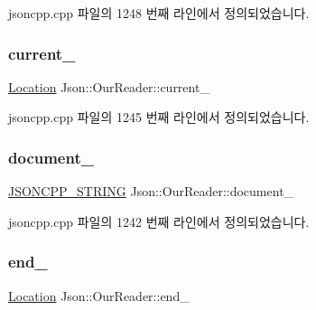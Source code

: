 jsoncpp.\+cpp 파일의 1248 번째 라인에서 정의되었습니다.

\mbox{\label{class_json_1_1_our_reader_a5211fbbba94be80a22dd2317c621efcc}} 
\subsubsection{\texorpdfstring{current\+\_\+}{current\_}}
{\footnotesize\ttfamily \hyperlink{class_json_1_1_our_reader_a1bdc7bbc52ba87cae6b19746f2ee0189}{Location} Json\+::\+Our\+Reader\+::current\+\_\+\hspace{0.3cm}{\ttfamily [private]}}



jsoncpp.\+cpp 파일의 1245 번째 라인에서 정의되었습니다.

\mbox{\label{class_json_1_1_our_reader_a726230af83d22d25e0c76cec3408ecf1}} 
\subsubsection{\texorpdfstring{document\+\_\+}{document\_}}
{\footnotesize\ttfamily \hyperlink{json_8h_a1e723f95759de062585bc4a8fd3fa4be}{J\+S\+O\+N\+C\+P\+P\+\_\+\+S\+T\+R\+I\+NG} Json\+::\+Our\+Reader\+::document\+\_\+\hspace{0.3cm}{\ttfamily [private]}}



jsoncpp.\+cpp 파일의 1242 번째 라인에서 정의되었습니다.

\mbox{\label{class_json_1_1_our_reader_ab1f69b0260c27a0d2d65dc56e42c8f9d}} 
\subsubsection{\texorpdfstring{end\+\_\+}{end\_}}
{\footnotesize\ttfamily \hyperlink{class_json_1_1_our_reader_a1bdc7bbc52ba87cae6b19746f2ee0189}{Location} Json\+::\+Our\+Reader\+::end\+\_\+\hspace{0.3cm}{\ttfamily [private]}}



